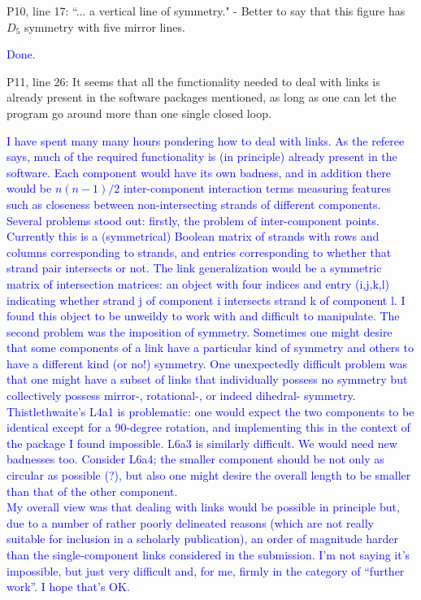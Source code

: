\documentclass[12pt]{article}
\begin{document}
P10, line 17: ``... a vertical line of symmetry." - Better to say that
this figure has $D_5$ symmetry with five mirror lines.


\textcolor{blue}{Done.}

P11, line 26: It seems that all the functionality needed to deal with
links is already present in the software packages mentioned, as long
as one can let the program go around more than one single closed loop.

\textcolor{blue}{I have spent many many hours pondering how to deal
  with links.  As the referee says, much of the required functionality
  is (in principle) already present in the software.  Each component
  would have its own badness, and in addition there would be
  $n(n-1)/2$ inter-component interaction terms measuring features such
  as closeness between non-intersecting strands of different
  components.  Several problems stood out: firstly, the problem of
  inter-component points.  Currently this is a (symmetrical) Boolean
  matrix of strands with rows and columns corresponding to strands,
  and entries corresponding to whether that strand pair intersects or
  not.  The link generalization would be a symmetric matrix of
  intersection matrices: an object with four indices and entry
  (i,j,k,l) indicating whether strand j of component i intersects
  strand k of component l.  I found this object to be unweildy to work
  with and difficult to manipulate.  The second problem was the
  imposition of symmetry.  Sometimes one might desire that some
  components of a link have a particular kind of symmetry and others
  to have a different kind (or no!) symmetry.  One unexpectedly
  difficult problem was that one might have a subset of links that
  individually possess no symmetry but collectively possess mirror-,
  rotational-, or indeed dihedral- symmetry.  Thistlethwaite's L4a1 is
  problematic: one would expect the two components to be identical
  except for a 90-degree rotation, and implementing this in the
  context of the package I found impossible. L6a3 is similarly
  difficult.  We would need new badnesses too.  Consider L6a4; the
  smaller component should be not only as circular as possible (?),
  but also one might desire the overall length to be smaller than that
  of the other component.\\ My overall view was that dealing with
  links would be possible in principle but, due to a number of rather
  poorly delineated reasons (which are not really suitable for
  inclusion in a scholarly publication), an order of magnitude harder
  than the single-component links considered in the submission.  I'm
  not saying it's impossible, but just very difficult and, for me,
  firmly in the category of ``further work''.  I hope that's OK.}
\end{document}
